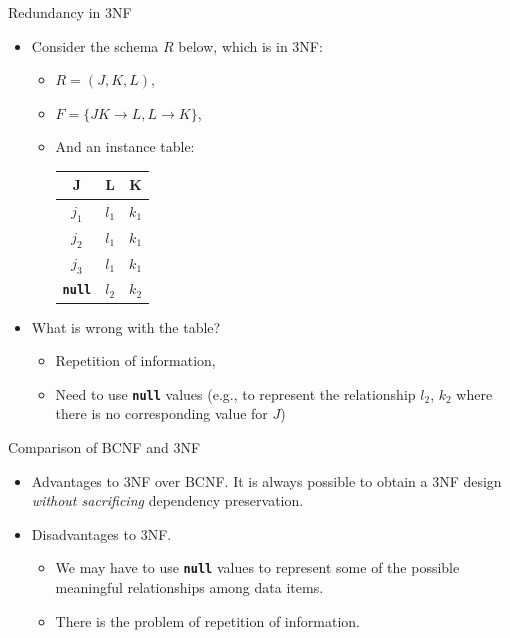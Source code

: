 \documentclass[aspectratio=169]{beamer}
\begin{document}
\begin{frame}{Redundancy in 3NF}
    \begin{itemize}
        \item Consider the schema $R$ below, which is in 3NF:
            \begin{itemize}
                \item $R = (J, K, L )$,
                \item $F = \{JK \rightarrow L, L \rightarrow K \}$,
                \item And an instance table:
                    \begin{center}
                        \begin{tabular}{| c | c | c |}
                            \hline
                            J     & L     & K     \\
                            \hline
                            $j_1$ & $l_1$ & $k_1$ \\
                            $j_2$ & $l_1$ & $k_1$ \\
                            $j_3$ & $l_1$ & $k_1$ \\
                            \texttt{\textbf{null}} & $l_2$ & $k_2$ \\
                            \hline
                        \end{tabular}
                    \end{center}
            \end{itemize}
        \item What is wrong with the table? \pause
            \begin{itemize}
                \item Repetition of information,
                \item Need to use \texttt{\textbf{null}} values (e.g., to represent the relationship $l_2$, $k_2$ where there is no corresponding value for $J$)
            \end{itemize}
    \end{itemize}
\end{frame}

\begin{frame}{Comparison of BCNF and 3NF}
    \begin{itemize}
        \item Advantages to 3NF over BCNF. It is always possible to obtain a 3NF design \textit{without sacrificing} dependency preservation.
        \item Disadvantages to 3NF.
            \begin{itemize}
                \item We may have to use \texttt{\textbf{null}} values to represent some of the possible meaningful relationships among data items.
                \item There is the problem of repetition of information.
            \end{itemize}
    \end{itemize}
\end{frame}
\end{document}
